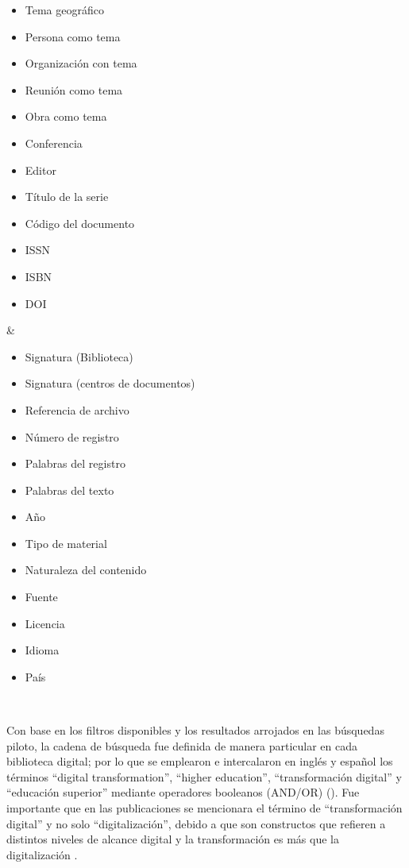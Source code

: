 \begin{table}[htpb]
\begin{threeparttable}
\begin{tabular}
\begin{itemize}[leftmargin=*, nosep]
                \item Tema geográfico
                \item Persona como tema
                \item Organización con tema
                \item Reunión como tema
                \item Obra como tema
                \item Conferencia
                \item Editor
                \item Título de la serie
                \item Código del documento
                \item ISSN
                \item ISBN
                \item DOI
            \end{itemize}
         &
            \begin{itemize}[leftmargin=*, nosep]
                \item Signatura (Biblioteca)
                \item Signatura (centros de documentos)
                \item Referencia de archivo
                \item Número de registro
                \item Palabras del registro
                \item Palabras del texto
                \item Año
                \item Tipo de material
                \item Naturaleza del contenido
                \item Fuente
                \item Licencia
                \item Idioma
                \item País
            \end{itemize}
         \\ 
	 \bottomrule
	 \end{tabular}
	 \end{threeparttable}
	 \end{table}

    Con base en los filtros disponibles y los resultados arrojados en las
    búsquedas piloto, la cadena de búsqueda fue definida de manera
    particular en cada biblioteca digital; por lo que se emplearon e
    intercalaron en inglés y español los términos ``digital
    transformation'', ``higher education'', ``transformación digital'' y
    ``educación superior'' mediante operadores booleanos (AND/OR) ().
    Fue importante que en las publicaciones se mencionara el término de
    ``transformación digital'' y no solo ``digitalización'', debido a que
    son constructos que refieren a distintos niveles de alcance digital y la
    transformación es más que la digitalización \cite{grajek2020}.
    
